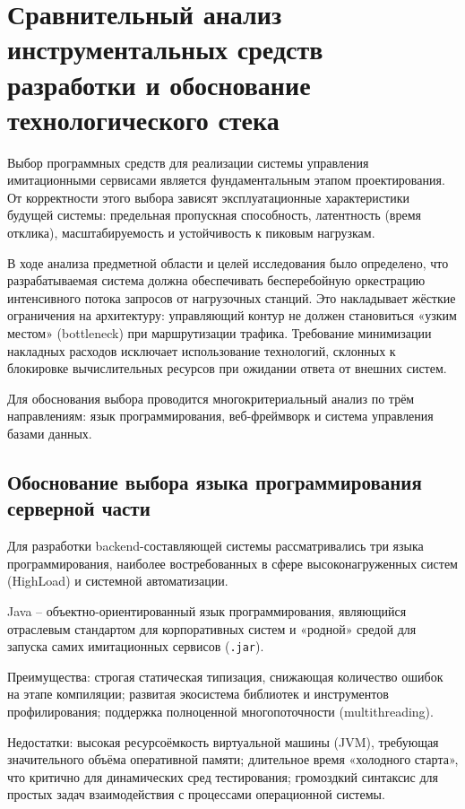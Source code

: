 \section{Сравнительный анализ инструментальных средств разработки и обоснование технологического стека}

Выбор программных средств для реализации системы управления имитационными сервисами является фундаментальным этапом проектирования. От корректности этого выбора зависят эксплуатационные характеристики будущей системы: предельная пропускная способность, латентность (время отклика), масштабируемость и устойчивость к пиковым нагрузкам.

В ходе анализа предметной области и целей исследования было определено, что разрабатываемая система должна обеспечивать бесперебойную оркестрацию интенсивного потока запросов от нагрузочных станций. Это накладывает жёсткие ограничения на архитектуру: управляющий контур не должен становиться «узким местом» (bottleneck) при маршрутизации трафика. Требование минимизации накладных расходов исключает использование технологий, склонных к блокировке вычислительных ресурсов при ожидании ответа от внешних систем.

Для обоснования выбора проводится многокритериальный анализ по трём направлениям: язык программирования, веб-фреймворк и система управления базами данных.

\subsection{Обоснование выбора языка программирования серверной части}

Для разработки backend-составляющей системы рассматривались три языка программирования, наиболее востребованных в сфере высоконагруженных систем (HighLoad) и системной автоматизации.

Java -- объектно-ориентированный язык программирования, являющийся отраслевым стандартом для корпоративных систем и «родной» средой для запуска самих имитационных сервисов (\texttt{.jar}).

Преимущества: строгая статическая типизация, снижающая количество ошибок на этапе компиляции; развитая экосистема библиотек и инструментов профилирования; поддержка полноценной многопоточности (multithreading).

Недостатки: высокая ресурсоёмкость виртуальной машины (JVM), требующая значительного объёма оперативной памяти; длительное время «холодного старта», что критично для динамических сред тестирования; громоздкий синтаксис для простых задач взаимодействия с процессами операционной системы.

